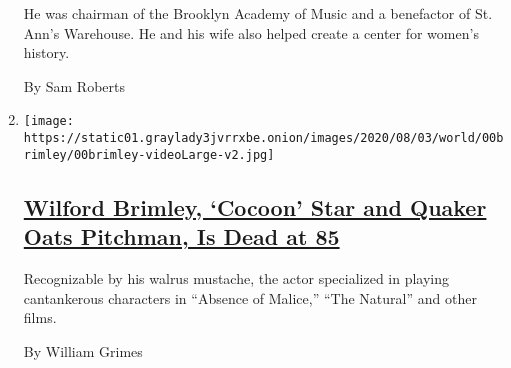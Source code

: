 \begin{enumerate}
  He was chairman of the Brooklyn Academy of Music and a benefactor of
  St. Ann's Warehouse. He and his wife also helped create a center for
  women's history.

  By Sam Roberts
\item
  \texttt{[image: https://static01.graylady3jvrrxbe.onion/images/2020/08/03/world/00brimley/00brimley-videoLarge-v2.jpg]}

  \hypertarget{wilford-brimley-cocoon-star-and-quaker-oats-pitchman-is-dead-at-85}{%
  \subsection{\texorpdfstring{\href{/2020/08/01/obituaries/wilford-brimley-dead.html}{Wilford
  Brimley, `Cocoon' Star and Quaker Oats Pitchman, Is Dead at
  85}}{Wilford Brimley, `Cocoon' Star and Quaker Oats Pitchman, Is Dead at 85}}\label{wilford-brimley-cocoon-star-and-quaker-oats-pitchman-is-dead-at-85}}

  Recognizable by his walrus mustache, the actor specialized in playing
  cantankerous characters in ``Absence of Malice,'' ``The Natural'' and
  other films.

  By William Grimes
\end{enumerate}


